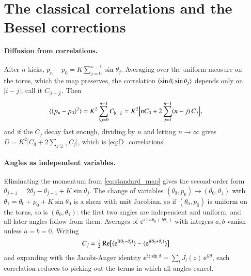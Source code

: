 \section{The classical correlations and the Bessel corrections}
\label{app:correlations}

\paragraph{Diffusion from correlations.}
After $n$ kicks, $p_n - p_0 = K\sum_{j=0}^{n-1}\sin\theta_j$. Averaging over the uniform measure on the torus,
which the map preserves, the correlation $\langle \sin\theta_i\sin\theta_j \rangle$ depends only on $|i - j|$; call it
$C_{|i-j|}$. Then
\begin{equation}
  \langle (p_n - p_0)^2 \rangle = K^2\sum_{i,j=0}^{n-1} C_{|i-j|} = K^2\Bigl[nC_0 + 2\sum_{j=1}^{n-1}(n - j)\,C_j\Bigr],
\end{equation}
and if the $C_j$ decay fast enough, dividing by $n$ and letting $n\to\infty$ gives
$D = K^2\bigl[C_0 + 2\sum_{j\ge1}C_j\bigr]$, which is \cref{eq:D_correlations}.

\paragraph{Angles as independent variables.}
Eliminating the momentum from \cref{eq:standard_map} gives the second-order form
$\theta_{j+1} = 2\theta_j - \theta_{j-1} + K\sin\theta_j$. The change of variables
$(\theta_0, p_0) \mapsto (\theta_0, \theta_1)$ with $\theta_1 = \theta_0 + p_0 + K\sin\theta_0$ is a shear
with unit Jacobian, so if $(\theta_0, p_0)$ is uniform on the torus, so is $(\theta_0, \theta_1)$: the first
two angles are independent and uniform, and all later angles follow from them. Averages of
$\ee^{i(a\theta_0 + b\theta_1)}$ with integers $a, b$ vanish unless $a = b = 0$. Writing
\begin{equation}
  C_j = \tfrac12\,\mathrm{Re}\bigl[\langle \mathrm{e}^{i(\theta_0 - \theta_j)} \rangle - \langle \mathrm{e}^{i(\theta_0 + \theta_j)} \rangle\bigr]
\end{equation}
and expanding with the Jacobi-Anger identity $\ee^{iz\sin\theta} = \sum_l J_l(z)\,\ee^{il\theta}$, each
correlation reduces to picking out the terms in which all angles cancel.

